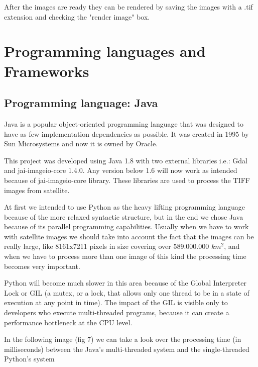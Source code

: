 \documentclass[12pt, a4paper]{report}
\begin{document}
After the images are ready they can be rendered by saving the images with a .tif extension and checking the "render image" box.



\section{Programming languages and Frameworks} 

\subsection{Programming language: Java}
\medskip

\quad
Java is a popular object-oriented programming language that was designed to have as few implementation dependencies as possible. It was created in 1995 by Sun Microsystems and now it is owned by Oracle.
\par

This project was developed using Java 1.8 with two external libraries i.e.: Gdal and jai-imageio-core 1.4.0. Any version below 1.6 will now work as intended because of jai-imageio-core library. These libraries are used to process the TIFF images from satellite.
\par

At first we intended to use Python as the heavy lifting programming language because of the more relaxed syntactic structure, but in the end we chose Java because of its parallel programming capabilities. Usually when we have to work with satellite images we should take into account the fact that the images can be really large, like 8161x7211 pixels in size covering over 589.000.000 $km^2$, and when we have to process more than one image of this kind the processing time becomes very important.
\par

Python will become much slower in this area because of the Global Interpreter Lock or GIL (a mutex, or a lock, that allows only one thread to be in a state of execution at any point in time). The impact of the GIL is visible only to developers who execute multi-threaded programs, because it can create a performance bottleneck at the CPU level.
 \par
 
\bigskip

In the following image (fig 7) we can take a look over the processing time (in milliseconds) between the Java's multi-threaded system and the single-threaded Python's system
\par
\end{document}
